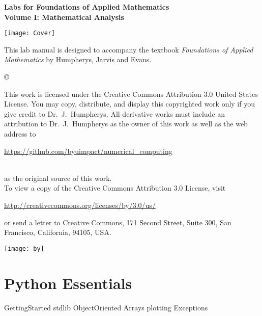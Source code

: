 \documentclass[nociteref]{SIAM-GH-book}
\begin{document}

\thispagestyle{empty} %

\begin{center} 
{\huge \bf Labs for Foundations of Applied Mathematics} \\
\vspace{5mm}
{\Large \bf Volume I: Mathematical Analysis}
\vspace{20mm}

\texttt{[image: Cover]}
\end{center}
\frontmatter



\begin{thepreface} %

This lab manual is designed to accompany the textbook \emph{Foundations of Applied Mathematics} by Humpherys, Jarvis and Evans.

\vfill
\copyright{This work is licensed under the Creative Commons Attribution 3.0 United States
License.  You may copy, distribute, and display this copyrighted work only if you give
credit to Dr.~J.~Humpherys. All derivative works must include an attribution to Dr.~J.~Humpherys as the owner of this work as well as the web address to
\\\centerline{\url{https://github.com/byuimpact/numerical_computing}}\\ as the original source of
this
work.\\To view a copy of the Creative Commons Attribution 3.0 License,
visit\\\centerline{\url{http://creativecommons.org/licenses/by/3.0/us/}} or send a letter to
Creative Commons, 171 Second Street, Suite 300, San Francisco, California, 94105, USA.}

\vfill
\centering\texttt{[image: by]}
\vfill
\end{thepreface}

\setcounter{tocdepth}{1}
\tableofcontents

\mainmatter


\part{Python Essentials}
{GettingStarted}
{stdlib}
{ObjectOriented}
{Arrays}
{plotting}
{Exceptions}
\end{document}
